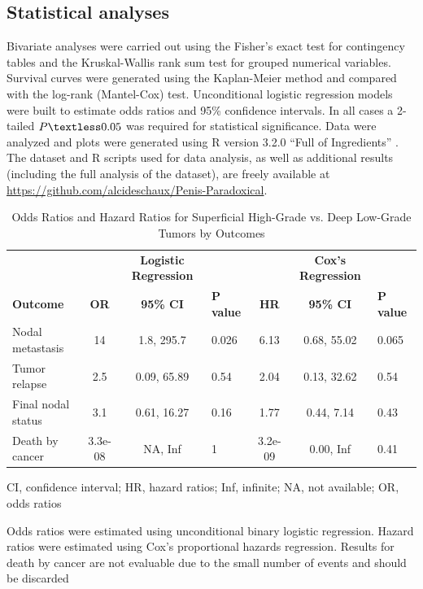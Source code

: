 \documentclass[11pt,letterpaper]{article}\usepackage[]{graphicx}\usepackage[]{color}
\begin{document}
\begin{multicols}{2}
\subsection*{Statistical analyses}
Bivariate analyses were carried out using the Fisher's exact test for contingency tables and the Kruskal-Wallis rank sum test for grouped numerical variables. Survival curves were generated using the Kaplan-Meier method and compared with the log-rank (Mantel-Cox) test. Unconditional logistic regression models were built to estimate odds ratios and 95\% confidence intervals. In all cases a 2-tailed $P\textless 0.05$ was required for statistical significance. Data were analyzed and plots were generated using R version 3.2.0 ``Full of Ingredients'' \cite{RCoreTeam}. The dataset and R scripts used for data analysis, as well as additional results (including the full analysis of the dataset), are freely available at \url{https://github.com/alcideschaux/Penis-Paradoxical}.

\begin{table}
\centering
\caption{Odds Ratios and Hazard Ratios for Superficial High-Grade vs. Deep Low-Grade Tumors by Outcomes}
\label{Table_OR}
\begin{tabular}{lcclccl}
\hline
~ & ~ & \textbf{Logistic Regression} & ~ & ~ & \textbf{Cox's Regression} & ~ \\
\textbf{Outcome} &  \textbf{OR} & \textbf{95\% CI} & \textbf{P value} &
                    \textbf{HR} & \textbf{95\% CI} & \textbf{P value} \\
\hline
Nodal metastasis
        & 14
        &   1.8, 295.7
        & 0.026
        & 6.13
        &  0.68, 55.02
        & 0.065 \\
Tumor relapse
        & 2.5
        &  0.09, 65.89
        & 0.54
        & 2.04
        &  0.13, 32.62
        & 0.54 \\
Final nodal status
        & 3.1
        &  0.61, 16.27
        & 0.16
        & 1.77
        & 0.44, 7.14
        & 0.43 \\
Death by cancer
        & 3.3e-08
        &  NA, Inf
        & 1
        & 3.2e-09
        & 0.00,  Inf
        & 0.41 \\
\hline
\end{tabular}
\begin{tablenotes}
\small
\item CI, confidence interval; HR, hazard ratios; Inf, infinite; NA, not available; OR, odds ratios
\item Odds ratios were estimated using unconditional binary logistic regression. Hazard ratios were estimated using Cox's proportional hazards regression. Results for death by cancer are not evaluable due to the small number of events and should be discarded
\end{tablenotes}
\end{table}


\end{multicols}
\end{document}
